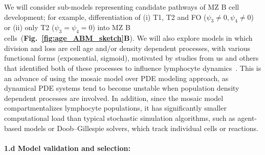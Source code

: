 \documentclass[11pt]{article}
\newcommand{\khi}{\ensuremath{\text{Ki67}^\text{hi}}~}
\newcommand{\para}[1]{\vspace*{-4.5mm}\paragraph{#1}}
\begin{document}
We will consider sub-models representing candidate pathways of MZ B cell development; for example, differentiation of (i) T1, T2 and FO ($\psi_{3}\neq0, \psi_{4}\neq0$) or (ii) only T2 ($\psi_{3} = \psi_{4} = 0$) into MZ B cells~(\textbf{Fig.~\ref{fig:age_ABM_sketch}B}).
We will also explore models in which division and loss are cell age and/or density dependent processes, with various functional forms (exponential, sigmoid), motivated by studies from us and others that identified both of these processes to influence lymphocyte dynamics~\cite{Rane_2022, Rane_2018, Hogan_2015,  De_Boer_2013, DeBoer_2001, Min_2003, Freitas_1995}.
This is an advance of using the mosaic model over PDE modeling approach, as dynamical PDE systems tend to become unstable when population density dependent processes are involved.
In addition, since the mosaic model compartmentalizes lymphocyte populations, it has significantly smaller computational load than typical stochastic simulation algorithms, such as agent-based models or Doob–Gillespie solvers, which track individual cells or reactions. %

%


\para{{1.d Model validation and selection:}} \label{sec:stats-validation}
\end{document}
